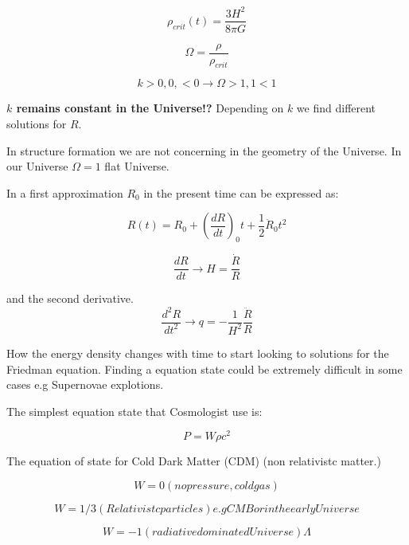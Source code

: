 \documentclass[a4paper, 12pt]{article} %
\begin{document}
\begin{equation}
\rho_{crit}(t) = \dfrac{3 H^2}{8 \pi G}
\end{equation}

\begin{equation}
\Omega = \dfrac{\rho}{\rho_{crit}}
\end{equation}

\[
k >0, 0, <0 \rightarrow \Omega >1, 1 <1
\]

\textbf{$k$ remains constant in the Universe!?} Depending on $k$
we find different solutions for $R$.

In structure formation we are not concerning in the geometry of the
Universe. In our Universe $\Omega=1$ flat Universe. 

In a first approximation $R_0$ in the present time 
can be expressed as:

\begin{equation}
R(t) = R_0 + (\dfrac{dR}{dt})_0t + \dfrac{1}{2}\ddot{R}_0t^2
\end{equation}

\begin{equation}
\dfrac{dR}{dt} \rightarrow H = \dfrac{\dot{R}}{R} 
\end{equation}

and the second derivative. 
\begin{equation}
\dfrac{d^2R}{dt^2} \rightarrow q = - \dfrac{1}{H^2}\dfrac{\ddot R}{R}
\end{equation}

How the energy density changes with time to start looking to solutions
for the Friedman equation. Finding a equation state could be extremely 
difficult in some cases e.g Supernovae explotions. 

The simplest equation state that Cosmologist use is:

\begin{equation}
P = W\rho c^2
\end{equation}

The equation of state for Cold Dark Matter (CDM) (non relativistc
matter.)

\begin{equation}
W = 0 (no pressure, cold gas)
\end{equation}

\begin{equation}
W = 1/3 (Relativistc particles) e.g CMB or in the early Universe
\end{equation}

\begin{equation}
W = -1 (radiative dominated Universe) \Lambda
\end{equation}
\end{document}
